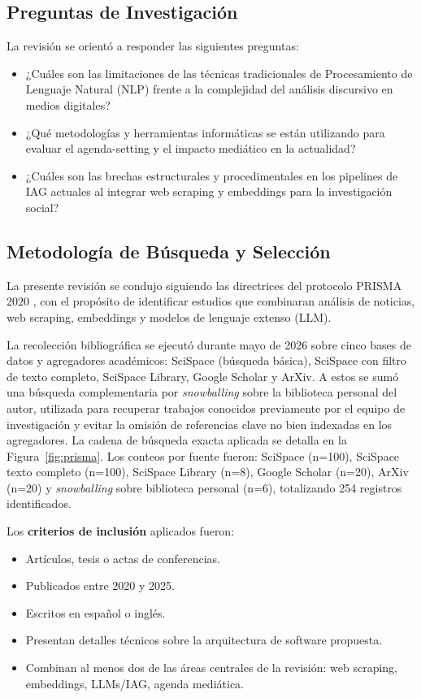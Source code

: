 \documentclass[12pt]{report}
\begin{document}
\subsection{Preguntas de Investigación}
\label{sec:rsl-pr}
La revisión se orientó a responder las siguientes preguntas:
\begin{itemize}
  \item [PR1:] ¿Cuáles son las limitaciones de las técnicas tradicionales de Procesamiento de Lenguaje Natural (NLP) frente a la complejidad del análisis discursivo en medios digitales?
  \item [PR2:] ¿Qué metodologías y herramientas informáticas se están utilizando para evaluar el agenda-setting y el impacto mediático en la actualidad?
  \item [PR3:] ¿Cuáles son las brechas estructurales y procedimentales en los pipelines de IAG actuales al integrar web scraping y embeddings para la investigación social?
\end{itemize}

\subsection{Metodología de Búsqueda y Selección}
\label{sec:rsl-metodologia}

La presente revisión se condujo siguiendo las directrices del protocolo PRISMA 2020 \citep{page2021prisma}, con el propósito de identificar estudios que combinaran análisis de noticias, web scraping, embeddings y modelos de lenguaje extenso (LLM).

La recolección bibliográfica se ejecutó durante mayo de 2026 sobre cinco bases de datos y agregadores académicos: SciSpace (búsqueda básica), SciSpace con filtro de texto completo, SciSpace Library, Google Scholar y ArXiv. A estos se sumó una búsqueda complementaria por \textit{snowballing} sobre la biblioteca personal del autor, utilizada para recuperar trabajos conocidos previamente por el equipo de investigación y evitar la omisión de referencias clave no bien indexadas en los agregadores. La cadena de búsqueda exacta aplicada se detalla en la Figura~\ref{fig:prisma}. Los conteos por fuente fueron: SciSpace (n=100), SciSpace texto completo (n=100), SciSpace Library (n=8), Google Scholar (n=20), ArXiv (n=20) y \textit{snowballing} sobre biblioteca personal (n=6), totalizando 254 registros identificados.

Los \textbf{criterios de inclusión} aplicados fueron:

\begin{itemize}
  \item [CI1:] Artículos, tesis o actas de conferencias.
  \item [CI2:] Publicados entre 2020 y 2025.
  \item [CI3:] Escritos en español o inglés.
  \item [CI4:] Presentan detalles técnicos sobre la arquitectura de software propuesta.
  \item [CI5:] Combinan al menos dos de las áreas centrales de la revisión: web scraping, embeddings, LLMs/IAG, agenda mediática.
\end{itemize}
\end{document}
